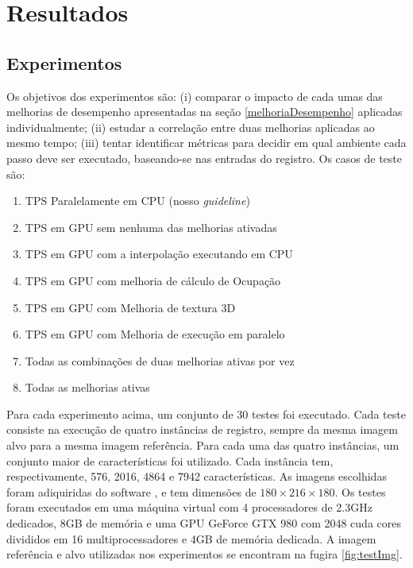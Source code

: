 \chapter{Resultados}
\label{cap:resultados}

\section{Experimentos}
  Os objetivos dos experimentos são: (i) comparar o impacto de cada umas das
melhorias de desempenho apresentadas na seção \ref{melhoriaDesempenho} aplicadas
individualmente; (ii) estudar a correlação entre duas melhorias aplicadas ao
mesmo tempo; (iii) tentar identificar métricas para decidir em qual ambiente
cada passo deve ser executado, baseando-se nas entradas do registro. Os casos
de teste são:

\begin{enumerate}
  \item TPS Paralelamente em CPU (nosso \textit{guideline})
  \item TPS em GPU sem nenhuma das melhorias ativadas
  \item TPS em GPU com a interpolação executando em CPU
  \item TPS em GPU com melhoria de cálculo de Ocupação
  \item TPS em GPU com Melhoria de textura 3D
  \item TPS em GPU com Melhoria de execução em paralelo
  \item Todas as combinações de duas melhorias ativas por vez
  \item Todas as melhorias ativas
\end{enumerate}

  Para cada experimento acima, um conjunto de 30 testes foi executado. Cada
teste consiste na execução de quatro instâncias de registro, sempre da mesma
imagem alvo para a mesma imagem referência. Para cada uma das quatro instâncias,
um conjunto maior de características foi utilizado. Cada instância tem,
respectivamente, 576, 2016, 4864 e 7942 características. As imagens escolhidas
foram adiquiridas do software \cite{papademetris2005bioimage}, e tem
dimensões de $180 \times 216 \times 180$. Os testes foram
executados em uma máquina virtual com 4 processadores de 2.3GHz dedicados,
8GB de memória e uma GPU GeForce GTX 980 com 2048 cuda cores divididos em
16 multiprocessadores e 4GB de memória dedicada. A imagem referência e alvo
utilizadas nos experimentos se encontram na fugira \ref{fig:testImg}.

